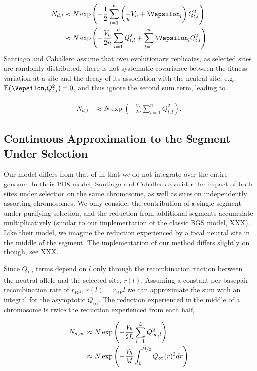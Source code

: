 \documentclass[11pt]{article}
\newcommand{\E}{\mathbb{E}}
\begin{document}
\begin{align}
  N_{d,t} &\approx N \exp\left(- \frac{1}{2}\sum_{l=1}^n \left(\frac{1}{n}V_{h} + \Vepsilon_l\right)  Q_{t,l}^2\right) \nonumber \\
          &\approx N \exp\left(- \frac{V_{h}}{2n} \sum_{l=1}^n Q_{t,l}^2+ \sum_{l=1}^n \Vepsilon_l  Q_{t,l}^2\right)
\end{align}
%
Santiago and Caballero assume that over evolutionary replicates, as selected
sites are randomly distributed, there is not systematic covariance between the
fitness variation at a site and the decay of its association with the neutral
site, e.g. $\E(\Vepsilon_l Q_{t,l}^2) = 0$, and thus ignore the second sum
term, leading to

\begin{align}
      N_{d,t} &\approx N \exp\left(- \frac{V_{h}}{2n} \sum_{l=1}^n Q_{t,l}^2\right).
\end{align}

\subsection{Continuous Approximation to the Segment Under Selection}

Our model differs from that of \textcite{Santiago1998-bs} in that we do not
integrate over the entire genome. In their 1998 model, Santiago and Caballero
consider the impact of both sites under selection on the same chromosome, as
well as sites on independently assorting chromosomes. We only consider the
contribution of a single segment under purifying selection, and the reduction
from additional segments accumulate multiplicatively (similar to our
implementation of the classic BGS model, XXX). Like their model, we imagine the
reduction experienced by a focal neutral site in the middle of the segment.
The implementation of our method differs slightly on though, see XXX.

Since $Q_{t,l}$ terms depend on $l$ only through the recombination fraction
between the neutral allele and the selected site, $r(l)$. Assuming a constant
per-basepair recombination rate of $r_\text{BP}$, $r(l) = r_\text{BP} l$ we can
approximate the sum with an integral for the asymptotic $Q_\infty$. The
reduction experienced in the middle of a chromosome is twice the reduction
experienced from each half, 

\begin{align}
      N_{d,\infty} &\approx N \exp\left(- \frac{V_{h}}{2L} \sum_{l=1}^L Q_{\infty,l}^2\right) \\
              &\approx N \exp\left(- \frac{V_{h}}{M} \int_0^{\nicefrac{M}{2}} Q_{\infty}(r)^2 dr \right) \\
\end{align}
\end{document}
